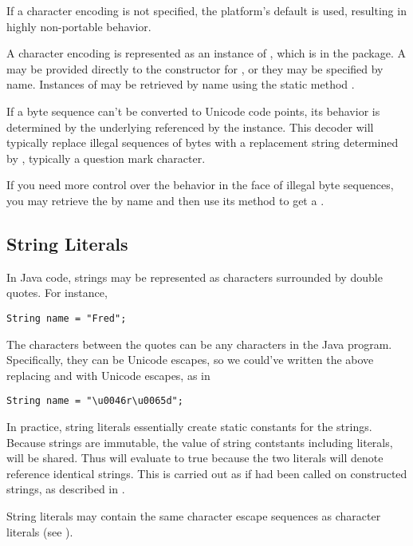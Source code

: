 If a character encoding is not specified, the platform's default is
used, resulting in highly non-portable behavior.

A character encoding is represented as an instance of ,
which is in the  package.  A  may
be provided directly to the constructor for , or they may
be specified by name.  Instances of  may be retrieved by
name using the static method .

If a byte sequence can't be converted to Unicode code points, its
behavior is determined by the underlying 
referenced by the  instance.  This decoder will
typically replace illegal sequences of bytes with a replacement string
determined by , typically a
question mark character.  

If you need more control over the behavior in the face of illegal byte
sequences, you may retrieve the  by name and then use
its  method to get a .

\subsection{String Literals}

In Java code, strings may be represented as characters surrounded
by double quotes.  For instance,
%
\begin{verbatim}
String name = "Fred";
\end{verbatim}
%
The characters between the quotes can be any characters in the Java
program.  Specifically, they can be Unicode escapes, so we could've
written the above replacing  and  with Unicode
escapes, as in
%
\begin{verbatim}
String name = "\u0046r\u0065d";
\end{verbatim}

In practice, string literals essentially create static constants for
the strings.  Because strings are immutable, the value of string
contstants including literals, will be shared.  Thus  will evaluate to true because the two literals will denote
reference identical strings.  This is carried out as if
 had been called on constructed strings, as described
in .

String literals may contain the same character escape sequences as
character literals (see ).



